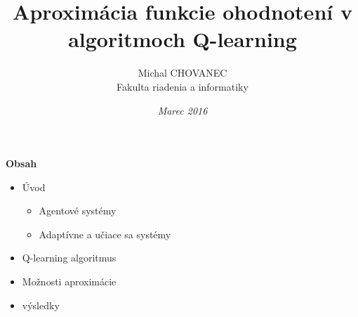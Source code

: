 \documentclass[xcolor=dvipsnames]{beamer}
\title{\bf Aproximácia funkcie ohodnotení v algoritmoch Q-learning}
\author{Michal CHOVANEC \\Fakulta riadenia a informatiky}
\date[EURP]{\it Marec 2016}
\begin{document}
\begin{frame}
\titlepage
\end{frame}

\begin{frame}{\bf Obsah}

\begin{itemize}
  \item Úvod
    \begin{itemize}
    \item Agentové systémy
    \item Adaptívne a učiace sa systémy
    \end{itemize}
  \item Q-learning algoritmus
  \item Možnosti aproximácie
  \item výsledky
\end{itemize}

\end{frame}
\end{document}
